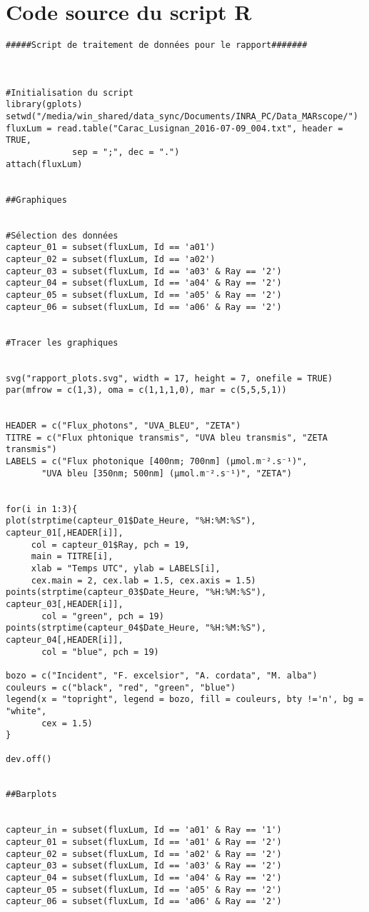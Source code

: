 ﻿\documentclass[12pt]{report}
\begin{document}
\chapter{Code source du script R}\label{App:appxC}

\begin{verbatim}
#####Script de traitement de données pour le rapport#######



#Initialisation du script
library(gplots)
setwd("/media/win_shared/data_sync/Documents/INRA_PC/Data_MARscope/")
fluxLum = read.table("Carac_Lusignan_2016-07-09_004.txt", header = TRUE,
		     sep = ";", dec = ".")
attach(fluxLum)


##Graphiques


#Sélection des données
capteur_01 = subset(fluxLum, Id == 'a01')
capteur_02 = subset(fluxLum, Id == 'a02')
capteur_03 = subset(fluxLum, Id == 'a03' & Ray == '2')
capteur_04 = subset(fluxLum, Id == 'a04' & Ray == '2')
capteur_05 = subset(fluxLum, Id == 'a05' & Ray == '2')
capteur_06 = subset(fluxLum, Id == 'a06' & Ray == '2')


#Tracer les graphiques


svg("rapport_plots.svg", width = 17, height = 7, onefile = TRUE)
par(mfrow = c(1,3), oma = c(1,1,1,0), mar = c(5,5,5,1))


HEADER = c("Flux_photons", "UVA_BLEU", "ZETA")
TITRE = c("Flux phtonique transmis", "UVA bleu transmis", "ZETA transmis")
LABELS = c("Flux photonique [400nm; 700nm] (µmol.m⁻².s⁻¹)",
	   "UVA bleu [350nm; 500nm] (µmol.m⁻².s⁻¹)", "ZETA")


for(i in 1:3){
plot(strptime(capteur_01$Date_Heure, "%H:%M:%S"), capteur_01[,HEADER[i]],
     col = capteur_01$Ray, pch = 19,
     main = TITRE[i],
     xlab = "Temps UTC", ylab = LABELS[i],
     cex.main = 2, cex.lab = 1.5, cex.axis = 1.5)
points(strptime(capteur_03$Date_Heure, "%H:%M:%S"), capteur_03[,HEADER[i]],
       col = "green", pch = 19)
points(strptime(capteur_04$Date_Heure, "%H:%M:%S"), capteur_04[,HEADER[i]],
       col = "blue", pch = 19)

bozo = c("Incident", "F. excelsior", "A. cordata", "M. alba")
couleurs = c("black", "red", "green", "blue")
legend(x = "topright", legend = bozo, fill = couleurs, bty !='n', bg = "white",
       cex = 1.5)
}

dev.off()


##Barplots


capteur_in = subset(fluxLum, Id == 'a01' & Ray == '1')
capteur_01 = subset(fluxLum, Id == 'a01' & Ray == '2')
capteur_02 = subset(fluxLum, Id == 'a02' & Ray == '2')
capteur_03 = subset(fluxLum, Id == 'a03' & Ray == '2')
capteur_04 = subset(fluxLum, Id == 'a04' & Ray == '2')
capteur_05 = subset(fluxLum, Id == 'a05' & Ray == '2')
capteur_06 = subset(fluxLum, Id == 'a06' & Ray == '2')



\end{verbatim}
\end{document}
